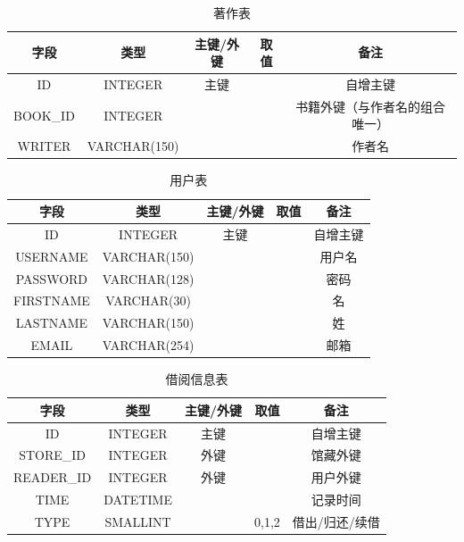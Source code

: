 \documentclass[a4paper,14pt]{article}
\begin{document}
    \begin{table}[htbp]
    \centering
    \caption{著作表}
    \begin{tabularx}{\textwidth}{|C|C|C|C|C|}
        \hline
        字段 & 类型 & 主键/外键 & 取值 & 备注 \\
        \hline
        ID & INTEGER & 主键 &  & 自增主键 \\
        \hline
        BOOK\_ID & INTEGER &  &  & 书籍外键（与作者名的组合唯一） \\
        \hline
        WRITER & VARCHAR(150) &  &  & 作者名 \\
        \hline
        \end{tabularx}
\end{table}

\begin{table}[htbp]
    \centering
    \caption{用户表}
    \begin{tabularx}{\textwidth}{|C|C|C|C|C|}
    \hline
    字段 & 类型 & 主键/外键 & 取值 & 备注 \\
    \hline
    ID & INTEGER & 主键 &  & 自增主键 \\
    \hline
    USERNAME & VARCHAR(150) &  &  & 用户名 \\
    \hline
    PASSWORD & VARCHAR(128) &  &  & 密码 \\
    \hline
    FIRSTNAME & VARCHAR(30) &  &  & 名 \\
    \hline
    LASTNAME & VARCHAR(150) &  &  & 姓 \\
    \hline
    EMAIL & VARCHAR(254) &  &  & 邮箱 \\
    \hline
    \end{tabularx}
\end{table}

\begin{table}[htbp]
    \centering
    \caption{借阅信息表}
    \begin{tabularx}{\textwidth}{|C|C|C|C|C|}
    \hline
    字段 & 类型 & 主键/外键 & 取值 & 备注 \\
    \hline
    ID & INTEGER & 主键 &  & 自增主键 \\
    \hline
    STORE\_ID & INTEGER & 外键 &  & 馆藏外键 \\
    \hline
    READER\_ID & INTEGER & 外键 &  & 用户外键 \\
    \hline
    TIME & DATETIME &  &  & 记录时间 \\
    \hline
    TYPE & SMALLINT &  & 0,1,2 & 借出/归还/续借 \\
    \hline
    \end{tabularx}
\end{table}
\end{document}
